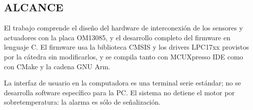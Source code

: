 \subsection{ALCANCE}

El trabajo comprende el diseño del hardware de interconexión de los sensores y
actuadores con la placa OM13085, y el desarrollo completo del firmware en lenguaje C. El
firmware usa la biblioteca CMSIS y los drivers LPC17xx provistos por la cátedra sin
modificarlos, y se compila tanto con MCUXpresso IDE como con CMake y la cadena GNU Arm.

La interfaz de usuario en la computadora es una terminal serie estándar; no se desarrolla
software específico para la PC. El sistema no detiene el motor por sobretemperatura: la
alarma es sólo de señalización.
